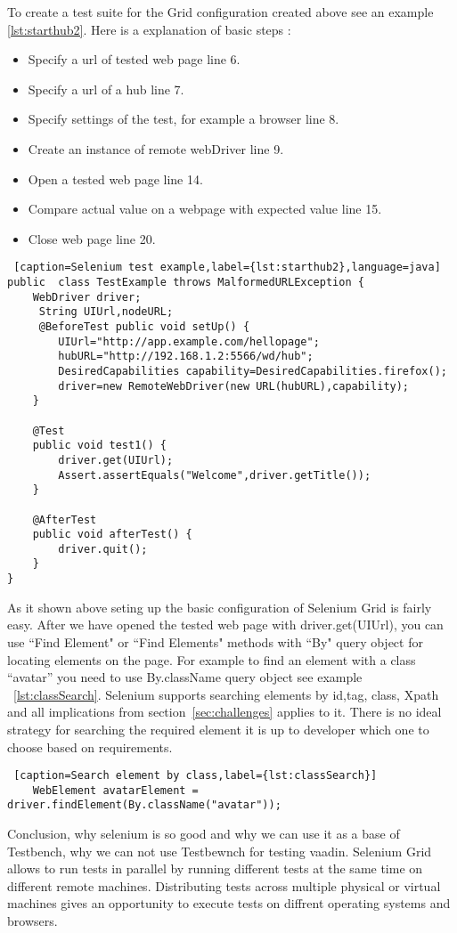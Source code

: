 	To create a test suite for the Grid configuration created above see an
	example \ref{lst:starthub2}. Here is a explanation of basic steps :
	\begin{itemize}
	  \item Specify a url of tested web page line 6.
	  \item Specify a url of a hub line 7.
	  \item Specify settings of the test, for example a browser line 8.
	  \item Create an instance of remote webDriver line 9.
	  \item Open a tested web page line 14.
	  \item Compare actual value on a webpage with expected value line 15.
	  \item Close web page line 20.
	\end{itemize}
	
	\lstset{style=a1listing}
	\begin{lstlisting} [caption=Selenium test example,label={lst:starthub2},language=java]
public 	class TestExample throws MalformedURLException {
 	WebDriver driver;
 	 String UIUrl,nodeURL;
 	 @BeforeTest public void setUp() {
 	 	UIUrl="http://app.example.com/hellopage"; 
		hubURL="http://192.168.1.2:5566/wd/hub";
		DesiredCapabilities capability=DesiredCapabilities.firefox();
		driver=new RemoteWebDriver(new URL(hubURL),capability);
	}
		
	@Test
	public void test1() {
		driver.get(UIUrl);
		Assert.assertEquals("Welcome",driver.getTitle());
	}
	
	@AfterTest
	public void afterTest() {
		driver.quit();
	}
}
	\end{lstlisting}

	As it shown above seting up the basic configuration of Selenium Grid is fairly
	easy. After we have opened the tested web page with driver.get(UIUrl), you can
	use ``Find Element" or ``Find Elements" methods with ``By" query object for
	locating elements on the page. For example to find an element with a
	class ``avatar'' you need to use By.className query object see example
	~\ref{lst:classSearch}. Selenium  supports searching elements by id,tag, class,
	Xpath and all implications from section~\ref{sec:challenges} applies to it. 
	There is no ideal strategy for searching the required element it is up
	to developer which one to choose based on requirements.
	
	\lstset{style=a1listing}
	\begin{lstlisting} [caption=Search element by class,label={lst:classSearch}]
	WebElement avatarElement = driver.findElement(By.className("avatar"));
	\end{lstlisting}

	Conclusion, why selenium is so good and why we can use it as a base of
	Testbench, why we can not use Testbewnch for testing vaadin. Selenium Grid
	allows to run tests in parallel by running different tests at the same time on different remote machines. Distributing tests across multiple physical or virtual machines gives an opportunity to execute
       tests on diffrent operating systems and browsers. 